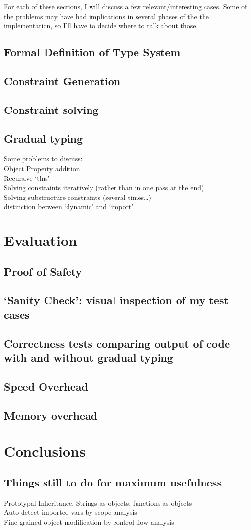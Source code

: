 \documentclass[12pt,a4paper,twoside,openright]{report}
\begin{document}
For each of these sections, I will discuss a few relevant/interesting
cases. Some of the problems may have had implications in several
phases of the the implementation, so I'll have to decide where to talk
about those. 


\section{Formal Definition of Type System}
\section{Constraint Generation}
\section{Constraint solving}
\section{Gradual typing}
Some problems to discuss: \\
Object Property addition \\
Recursive `this' \\
Solving constraints iteratively (rather than in one pass at the end) \\
Solving substructure constraints (several times\ldots) \\
distinction between `dynamic' and `import' \\
\chapter{Evaluation}\label{evaluation}
\section{Proof of Safety}
\section{`Sanity Check': visual inspection of my test cases}
\section{Correctness tests comparing output of code with and without gradual typing}
\section{Speed Overhead}
\section{Memory overhead}
\chapter{Conclusions}
\section{Things still to do for maximum usefulness}
Prototypal Inheritance, Strings as objects, functions as objects \\
Auto-detect imported vars by scope analysis \\
Fine-grained object modification by control flow analysis
\end{document}
